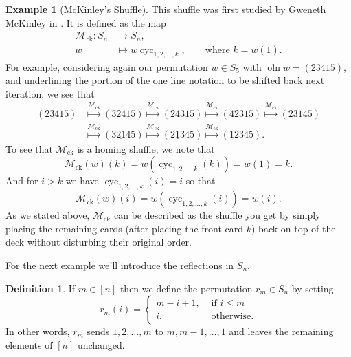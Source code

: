 \documentclass[final,nomarks]{dmtcs-episciences}
\theoremstyle{definition}
\theoremstyle{definition}
\newtheorem{defn}[thm]{Definition}
\newtheorem{exmp}[thm]{Example}
\theoremstyle{remark}
\newcommand{\mck}{\mathcal{M}_{\text{ck}}} %
\newcommand{\xmto}[1]{\overset{ #1 }{ \mapsto }}
\newcommand{\tup}[1]{\left( #1 \right)}
\newcommand{\cyc}[1]{\operatorname{cyc}_{#1}}
\newcommand{\oln}{\operatorname{oln}}
\begin{document}
\begin{exmp}[McKinley's Shuffle]
    This shuffle was first studied by Gweneth McKinley in \cite{McK2015}.
    It is defined as the map
    \begin{align*}
        \mck : S_{n} & \to S_{n},\\	
        w & \mapsto w\cyc{1,2,\dots,k}, \qquad \text{where } k = w\tup{1} .
    \end{align*}
    For example, considering again our permutation $w \in S_5$ with $\oln{w} = \tup{2 3 4 1 5}$, and underlining the portion of the one line notation to be shifted back next iteration, we see that  
    \begin{align*}
        \tup{2 \underline{3} 4 1 5} &\xmto{\mck} \tup{3 \underline{2 4} 1 5} \xmto{\mck} \tup{2 \underline{4} 3 1 5} \xmto{\mck} \tup{4 \underline{2 3 1} 5} \xmto{\mck} \tup{2 \underline{3} 1 4 5}\\
        &\xmto{\mck} \tup{3 \underline{2 1} 4 5} \xmto{\mck} \tup{2 \underline{1} 3 4 5} \xmto{\mck} \tup{1 2 3 4 5}.
    \end{align*}
   To see that $\mck$ is a homing shuffle, we note that
   \[
       \mck\tup{ w }\tup{ k } = w \tup{ \cyc{1,2,\dots,k }\tup{ k }} = w\tup{ 1 } = k.
   \]
   And for $ i > k $ we have $ \cyc{1,2,\dots,k}\tup{ i } = i $ so that 
   \[
       \mck\tup{ w }\tup{ i } = w \tup{ \cyc{1,2,\dots,k }\tup{ i }} = w\tup{ i }.
   \]
   As we stated above, $\mck$ can be described as the shuffle you get by simply placing the remaining cards (after placing the front card $k$) back on top of the deck without disturbing their original order.
\end{exmp}

For the next example we'll introduce the reflections in $ S_{n} $.
\begin{defn}
    If $ m \in [n] $ then we define the permutation $r_m \in S_n$ by setting
    \[
        r_{m}\tup{ i }
        = \begin{cases}
            m-i+1, & \text{ if } i \le m\\
            i, & \text{ otherwise}.
        \end{cases}
    \]
    In other words, $r_m$ sends $1,2,\ldots,m$ to $m,m-1,\ldots,1$ and leaves the remaining elements of $[n]$ unchanged.
\end{defn}
\end{document}
